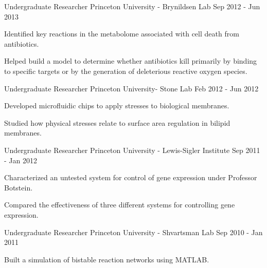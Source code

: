 \begin{cventries}
{\begin{cvitems}
      \end{cvitems}
    }
\ifoutdated
  \cventry
    {Undergraduate Researcher} %
    {Princeton University - Brynildsen Lab} %
    {} %
    {Sep 2012 - Jun 2013} %
    {
      \begin{cvitems} %
        \item Identified key reactions in the \ecoli metabolome associated with cell death from antibiotics.
        \item Helped build a model to determine whether antibiotics kill primarily by binding to specific targets or by the generation of deleterious reactive oxygen species.
      \end{cvitems}
    }
  \cventry
    {Undergraduate Researcher} %
    {Princeton University- Stone Lab} %
    {} %
    {Feb 2012 - Jun 2012} %
    {
      \begin{cvitems} %
        \item Developed microfluidic chips to apply stresses to biological membranes.
        \item Studied how physical stresses relate to surface area regulation in bilipid membranes.
      \end{cvitems}
    }
  \cventry
    {Undergraduate Researcher} %
    {Princeton University - Lewis-Sigler Institute} %
    {} %
    {Sep 2011 - Jan 2012} %
    {
      \begin{cvitems} %
        \item Characterized an untested system for control of gene expression under Professor Botstein.
        \item Compared the effectiveness of three different systems for controlling gene expression.
      \end{cvitems}
    }
  \cventry
    {Undergraduate Researcher} %
    {Princeton University - Shvartsman Lab} %
    {} %
    {Sep 2010 - Jan 2011} %
    {
      \begin{cvitems} %
        \item Built a simulation of bistable reaction networks using MATLAB.

\end{cvitems}}
\end{cventries}
